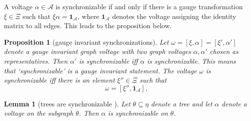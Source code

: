 \documentclass[10pt,reqno]{amsart}
\numberwithin{equation}{section}
\theoremstyle{bfnote}
\newtheorem{lemma}[theorem]{Lemma}
\newtheorem{proposition}[theorem]{Proposition}
\theoremstyle{bfdef}
\newcommand{\mc}[1]{\mathcal{#1}}
\newcommand{\mbf}[1]{\mathbf{#1}}
\providecommand\gt; %
\renewcommand{\gt}{\xi}
\providecommand\a; %
\renewcommand{\a}{\alpha}
\begin{document}
			A voltage $\a \in \mc{A}$ is synchronizable if and only if there is a gauge transformation $\xi \in \Xi$ such that $\xi \a = \mbf{1}_{\mc{A}}$, where $\mbf{1}_{\mc{A}}$ denotes the voltage assigning the identity matrix to all edges. This leads to the proposition below.
		\begin{proposition}[gauge invariant synchronizations]\label{prop:char-sync}
			Let $\omega = [\gt,\a] = [\gt',\a']$ denote a gauge invariant graph voltage with two graph voltages $\a,\a'$ chosen as representatives. Then $\a'$ is synchronizable iff $\a$ is synchronizable. This means that `synchronizable' is a gauge invariant statement. The voltage $\omega$ is synchronizable iff there is an element $\gt'' \in \Xi$ such that
			\begin{equation}
				\omega = [\gt'',\mbf{1}_{\mc{A}}],
			\end{equation}
		\end{proposition}

		\begin{lemma}[{trees are synchronizable \cite[Section 3.2.1]{Gattringer:2010zz}\cite[Remark 6.2]{jiangGaugeTheoryGraphs2023}}]\label{lem:tree-synchronization}
			Let $\theta \subseteq \eta$ denote a tree and let $\a$ denote a voltage on the subgraph $\theta$. Then $\a$ is synchronizable on $\theta$.
		\end{lemma}
\end{document}
